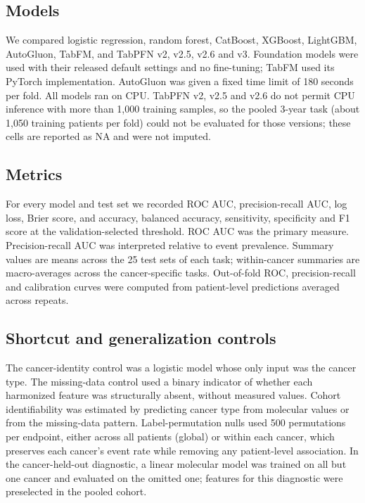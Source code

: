 \documentclass[11pt, a4paper, onecolumn, confidential, copyright]{hawkfranklin}
\begin{document}
\subsection{Models}

We compared logistic regression, random forest, CatBoost, XGBoost, LightGBM, AutoGluon, TabFM, and TabPFN v2, v2.5, v2.6 and v3.\citep{breiman2001random,chen2016xgboost,ke2017lightgbm,prokhorenkova2018catboost,erickson2020autogluon,hollmann2025accurate,google2026tabfm,tabfmsoftware2026} Foundation models were used with their released default settings and no fine-tuning; TabFM used its PyTorch implementation. AutoGluon was given a fixed time limit of 180 seconds per fold. All models ran on CPU. TabPFN v2, v2.5 and v2.6 do not permit CPU inference with more than 1,000 training samples, so the pooled 3-year task (about 1,050 training patients per fold) could not be evaluated for those versions; these cells are reported as NA and were not imputed.

\subsection{Metrics}

For every model and test set we recorded ROC AUC, precision-recall AUC, log loss, Brier score, and accuracy, balanced accuracy, sensitivity, specificity and F1 score at the validation-selected threshold. ROC AUC was the primary measure. Precision-recall AUC was interpreted relative to event prevalence. Summary values are means across the 25 test sets of each task; within-cancer summaries are macro-averages across the cancer-specific tasks. Out-of-fold ROC, precision-recall and calibration curves were computed from patient-level predictions averaged across repeats.

\subsection{Shortcut and generalization controls}

The cancer-identity control was a logistic model whose only input was the cancer type. The missing-data control used a binary indicator of whether each harmonized feature was structurally absent, without measured values. Cohort identifiability was estimated by predicting cancer type from molecular values or from the missing-data pattern. Label-permutation nulls used 500 permutations per endpoint, either across all patients (global) or within each cancer, which preserves each cancer's event rate while removing any patient-level association. In the cancer-held-out diagnostic, a linear molecular model was trained on all but one cancer and evaluated on the omitted one; features for this diagnostic were preselected in the pooled cohort.
\end{document}
